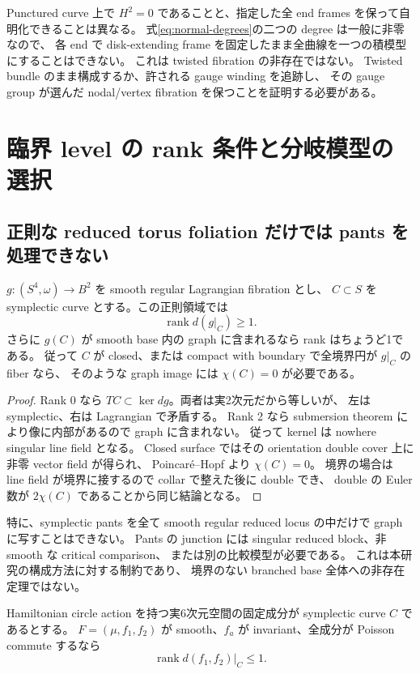 Punctured curve 上で $H^2=0$ であることと、指定した全 end frames を保って自明化できることは異なる。
式\eqref{eq:normal-degrees}の二つの degree は一般に非零なので、
各 end で disk-extending frame を固定したまま全曲線を一つの積模型にすることはできない。
これは twisted fibration の非存在ではない。
Twisted bundle のまま構成するか、許される gauge winding を追跡し、
その gauge group が選んだ nodal/vertex fibration を保つことを証明する必要がある。

\section{臨界 level の rank 条件と分岐模型の選択}\label{sec:rank}

\subsection{正則な reduced torus foliation だけでは pants を処理できない}

\begin{proposition}\label{prop:rank}
$g:(S^4,\omega)\to B^2$ を smooth regular Lagrangian fibration とし、
$C\subset S$ を symplectic curve とする。この正則領域では
\[
\operatorname{rank}d(g|_C)\ge1.
\]
さらに $g(C)$ が smooth base 内の graph に含まれるなら rank はちょうど1である。
従って $C$ が closed、または compact with boundary で全境界円が $g|_C$ の fiber なら、
そのような graph image には $\chi(C)=0$ が必要である。
\end{proposition}

\begin{proof}
Rank 0 なら $TC\subset\ker dg$。両者は実2次元だから等しいが、
左は symplectic、右は Lagrangian で矛盾する。
Rank 2 なら submersion theorem により像に内部があるので graph に含まれない。
従って kernel は nowhere singular line field となる。
Closed surface ではその orientation double cover 上に非零 vector field が得られ、
Poincaré--Hopf より $\chi(C)=0$。
境界の場合は line field が境界に接するので collar で整えた後に double でき、
double の Euler 数が $2\chi(C)$ であることから同じ結論となる。
\end{proof}

特に、symplectic pants を全て smooth regular reduced locus の中だけで graph に写すことはできない。
Pants の junction には singular reduced block、非 smooth な critical comparison、
または別の比較模型が必要である。
これは本研究の構成方法に対する制約であり、
境界のない branched base 全体への非存在定理ではない。

\begin{proposition}\label{prop:fixed-rank}
Hamiltonian circle action を持つ実6次元空間の固定成分が symplectic curve $C$ であるとする。
$F=(\mu,f_1,f_2)$ が smooth、$f_a$ が invariant、全成分が Poisson commute するなら
\[
\operatorname{rank}d(f_1,f_2)|_C\le1.
\]
\end{proposition}


